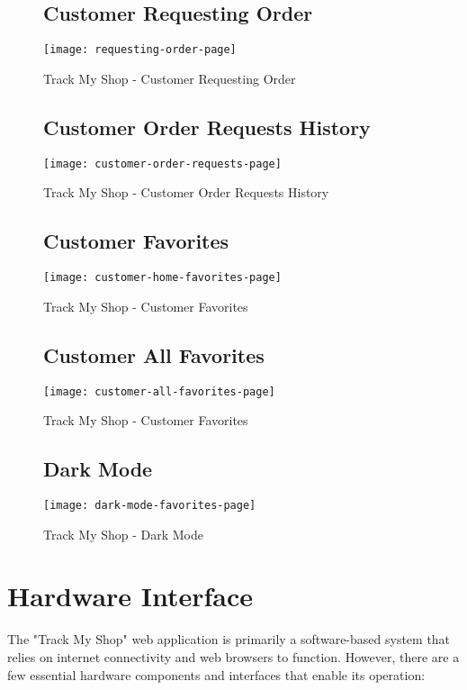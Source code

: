\begin{figure}[h]
	\subsection{Customer Requesting Order}
	\centering
	\texttt{[image: requesting-order-page]}
	\caption{Track My Shop - Customer Requesting Order}
\end{figure}
\newpage

\begin{figure}[h]
	\subsection{Customer Order Requests History}
	\centering
	\texttt{[image: customer-order-requests-page]}
	\caption{Track My Shop - Customer Order Requests History}
\end{figure}

\begin{figure}[h]
	\subsection{Customer Favorites}
	\centering
	\texttt{[image: customer-home-favorites-page]}
	\caption{Track My Shop - Customer Favorites}
\end{figure}
\pagebreak
\begin{figure}[h]
	\subsection{Customer All Favorites}
	\centering
	\texttt{[image: customer-all-favorites-page]}
	\caption{Track My Shop - Customer Favorites}
\end{figure}


\begin{figure}[h]
	\subsection{Dark Mode}
	\centering
	\texttt{[image: dark-mode-favorites-page]}
	\caption{Track My Shop - Dark Mode}
\end{figure}

\pagebreak
\section{Hardware Interface}
The "Track My Shop" web application is primarily a software-based system that relies on internet connectivity and web browsers to function. However, there are a few essential hardware components and interfaces that enable its operation:

